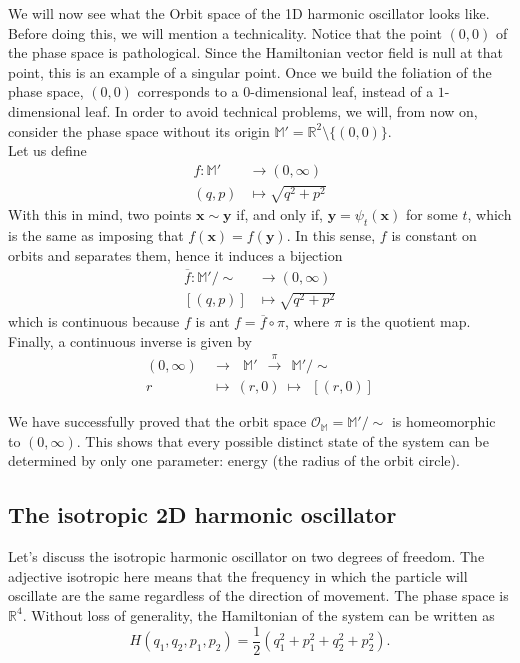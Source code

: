 \documentclass[12pt]{article}
\theoremstyle{plain}
\newcommand{\R}{\mathbb{R}}
\newcommand{\M}{\mathbb{M}}
\begin{document}
We will now see what the Orbit space of the 1D harmonic oscillator looks like. Before doing this, we will mention a technicality. Notice that the point $(0,0)$ of the phase space is pathological. Since the Hamiltonian vector field is null at that point, this is an example of a singular point. Once we build the foliation of the phase space, $(0,0)$ corresponds to a $0$-dimensional leaf, instead of a $1$-dimensional leaf. In order to avoid technical problems, we will, from now on,  consider the phase space without its origin $\M' = \R^2\setminus\{(0,0)\}$.\\

Let us define 
\begin{align*}
    f\colon \M' &\longrightarrow (0,\infty)\\
    (q,p)&\longmapsto \sqrt{q^2 + p^2}
\end{align*} With this in mind, two points $\mathbf{x}\sim \mathbf{y}$ if, and only if, $\mathbf{y} = \psi_t(\mathbf{x})$ for some $t$, which is the same as imposing that $f(\mathbf{x}) = f(\mathbf{y})$. In this sense, $f$ is constant on orbits and separates them, hence it induces a bijection 
\begin{align*}
    \overline{f}\colon \M'/\sim &\longrightarrow (0,\infty)\\
    [(q,p)]&\longmapsto \sqrt{q^2 + p^2}
\end{align*} which is continuous because $f$ is ant $f = \overline{f} \circ \pi$, where $\pi$ is the quotient map. Finally, a continuous inverse is given by
\begin{align*}
    (0,\infty)\ &\xrightarrow{}\ \ \ \M'\ \ \xrightarrow{\pi} \ \ \M'/\sim\\
    r\ \  &\mapsto\ (r,0)\  \mapsto\ \ [(r,0)]
\end{align*}

We have successfully proved that the orbit space $\mathcal{O}_\M = \M'/\sim$ is homeomorphic to $(0,\infty)$. This shows that every possible distinct state of the system can be determined by only one parameter: energy (the radius of the orbit circle).

\subsection{The isotropic 2D harmonic oscillator}

Let's discuss the isotropic harmonic oscillator on two degrees of freedom. The adjective isotropic here means that the frequency in which the particle will oscillate are the same regardless of the direction of movement. The phase space is $\R^4$. Without loss of generality, the Hamiltonian of the system can be written as $$H(q_1,q_2,p_1,p_2) = \frac{1}{2}\left(q_1^2 + p_1^2 + q_2^2 + p_2^2\right).$$
\end{document}
